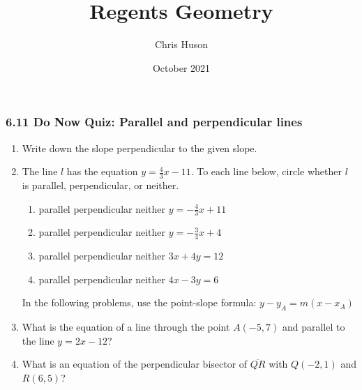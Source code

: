 \documentclass[12pt, twoside]{article}
\title{Regents Geometry}
\author{Chris Huson}
\date{October 2021}
\begin{document}
\subsubsection*{6.11 Do Now Quiz: Parallel and perpendicular lines}
\begin{enumerate}
\item Write down the slope perpendicular to the given slope. \vspace{0.5cm}
  \begin{enumerate}
  \end{enumerate} \vspace{0.5cm}

\item The line $l$ has the equation $y=\frac{4}{3}x-11$. To each line below, circle whether $l$ is parallel, perpendicular, or neither.
  \begin{enumerate}
    \item parallel \quad perpendicular \quad neither \qquad $y=-\frac{4}{3}x+11$
    \vspace{0.25cm}
    \item parallel \quad perpendicular \quad neither \qquad $y=-\frac{3}{4}x+4$
    \vspace{0.25cm}
    \item parallel \quad perpendicular \quad neither \qquad $3x+4y=12$
    \vspace{1.5cm}
    \item parallel \quad perpendicular \quad neither \qquad $4x-3y=6$
    \vspace{1.7cm}
  \end{enumerate}

In the following problems, use the point-slope formula: $y-y_A=m (x-x_A)$
  \item What is the equation of a line through the point $A(-5,7)$ and parallel to the line $y=2x-12$?  \vspace{1.5cm}

  \item What is an equation of the perpendicular bisector of $\overline{QR}$ with $Q(-2,1)$ and $R(6,5)$? %

\end{enumerate}
\end{document}
